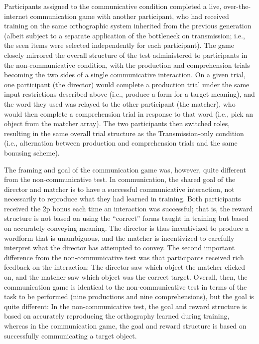 \documentclass[doc,biblatex]{apa7}
\begin{document}
Participants assigned to the communicative condition completed a live, over-the-internet communication game with another participant, who had received training on the same orthographic system inherited from the previous generation (albeit subject to a separate application of the bottleneck on transmission; i.e., the seen items were selected independently for each participant). The game closely mirrored the overall structure of the test administered to participants in the non-communicative condition, with the production and comprehension trials becoming the two sides of a single communicative interaction. On a given trial, one participant (the director) would complete a production trial under the same input restrictions described above (i.e., produce a form for a target meaning), and the word they used was relayed to the other participant (the matcher), who would then complete a comprehension trial in response to that word (i.e., pick an object from the matcher array). The two participants then switched roles, resulting in the same overall trial structure as the Transmission-only condition (i.e., alternation between production and comprehension trials and the same bonusing scheme).

The framing and goal of the communication game was, however, quite different from the non-communicative test. In communication, the shared goal of the director and matcher is to have a successful communicative interaction, not necessarily to reproduce what they had learned in training. Both participants received the 2p bonus each time an interaction was successful; that is, the reward structure is not based on using the ``correct'' forms taught in training but based on accurately conveying meaning. The director is thus incentivized to produce a wordform that is unambiguous, and the matcher is incentivized to carefully interpret what the director has attempted to convey. The second important difference from the non-communicative test was that participants received rich feedback on the interaction: The director saw which object the matcher clicked on, and the matcher saw which object was the correct target. Overall, then, the communication game is identical to the non-communicative test in terms of the task to be performed (nine productions and nine comprehensions), but the goal is quite different: In the non-communicative test, the goal and reward structure is based on accurately reproducing the orthography learned during training, whereas in the communication game, the goal and reward structure is based on successfully communicating a target object.
\end{document}
